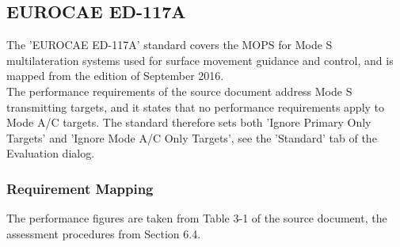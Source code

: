 \subsection{EUROCAE ED-117A}
\label{sec:appendix_eval_std_ed117a}

The 'EUROCAE ED-117A' standard covers the MOPS for Mode S multilateration systems used for surface movement guidance and control, and is mapped from the edition of September 2016. \\

The performance requirements of the source document address Mode S transmitting targets, and it states that no performance requirements apply to Mode A/C targets. The standard therefore sets both 'Ignore Primary Only Targets' and 'Ignore Mode A/C Only Targets', see the 'Standard' tab of the Evaluation dialog. \\

\subsubsection{Requirement Mapping}

The performance figures are taken from Table 3-1 of the source document, the assessment procedures from Section 6.4.

